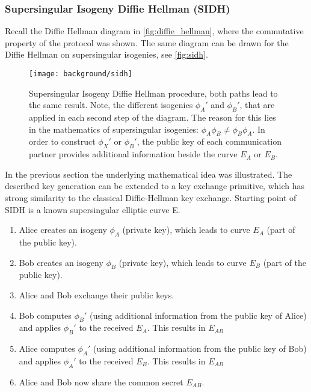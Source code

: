\subsubsection{Supersingular Isogeny Diffie Hellman (SIDH)}

Recall the Diffie Hellman diagram in  \autoref{fig:diffie_hellman}, where the commutative property of the protocol was shown. The same diagram can be drawn for the Diffie Hellman on supersingular isogenies, see \autoref{fig:sidh}. 
\begin{figure}[H]
  \centering
  \texttt{[image: background/sidh]}
  \caption[Supersingular Isogeny Diffie Hellman diagram]{Supersingular Isogeny Diffie Hellman procedure, both paths lead to the same result. Note, the different isogenies $\phi_{A}'$ and $\phi_{B}'$, that are applied in each second step of the diagram. The reason for this lies in the mathematics of supersingular isogenies: $\phi_{A} \phi_{B} \neq \phi_{B} \phi_{A}$. In order to construct $\phi_{X}'$ or $\phi_{B}'$, the public key of each communication partner provides additional information beside the curve $E_A$ or $E_B$.~\parencite{costello2016gentle}}
  \label{fig:sidh}
\end{figure}
In the previous section the underlying mathematical idea was illustrated. The described key generation can be extended to a key exchange primitive, which has strong similarity to the classical Diffie-Hellman key exchange. Starting point of SIDH is a known supersingular elliptic curve E. 

\begin{enumerate}
\item Alice creates an isogeny $\phi_A$ (private key), which leads to curve $E_A$ (part of the public key).
\item Bob creates an isogeny $\phi_B$ (private key), which leads to curve $E_B$ (part of the public key).
\item Alice and Bob exchange their public keys.
\item Bob computes $\phi_B'$ (using additional information from the public key of Alice) and applies $\phi_B'$ to the received $E_A$. This results in $E_{AB}$
\item Alice computes $\phi_A'$ (using additional information from the public key of Bob) and applies $\phi_A'$ to the received $E_B$. This results in $E_{AB}$
\item Alice and Bob now share the  common secret $E_{AB}$.
\end{enumerate}

